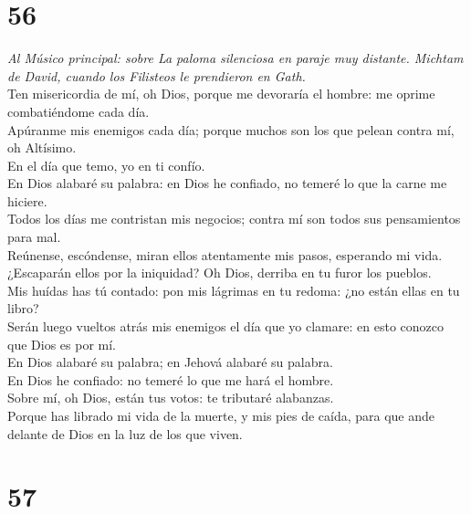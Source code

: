 \hypertarget{section-55}{%
\section{56}\label{section-55}}

 \emph{Al Músico principal: sobre La paloma silenciosa en
paraje muy distante. Michtam de David, cuando los Filisteos le
prendieron en Gath.}\\
Ten misericordia de mí, oh Dios, porque me devoraría el hombre: me
oprime combatiéndome cada día.\\
 Apúranme mis enemigos cada día; porque muchos son los que
pelean contra mí, oh Altísimo.\\
 En el día que temo, yo en ti confío.\\
 En Dios alabaré su palabra: en Dios he confiado, no temeré
lo que la carne me hiciere.\\
 Todos los días me contristan mis negocios; contra mí son
todos sus pensamientos para mal.\\
 Reúnense, escóndense, miran ellos atentamente mis pasos,
esperando mi vida.\\
 ¿Escaparán ellos por la iniquidad? Oh Dios, derriba en tu
furor los pueblos.\\
 Mis huídas has tú contado: pon mis lágrimas en tu redoma:
¿no están ellas en tu libro?\\
 Serán luego vueltos atrás mis enemigos el día que yo
clamare: en esto conozco que Dios es por mí.\\
 En Dios alabaré su palabra; en Jehová alabaré su
palabra.\\
 En Dios he confiado: no temeré lo que me hará el hombre.\\
 Sobre mí, oh Dios, están tus votos: te tributaré
alabanzas.\\
 Porque has librado mi vida de la muerte, y mis pies de
caída, para que ande delante de Dios en la luz de los que viven.

\hypertarget{section-56}{%
\section{57}\label{section-56}}

